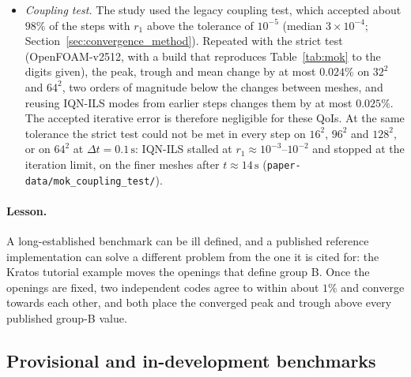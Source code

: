 \begin{itemize}
	\item \emph{Coupling test.} The study used the legacy coupling test, which accepted about $98\%$ of the steps with $r_1$ above the tolerance of $10^{-5}$ (median $3\times10^{-4}$; Section~\ref{sec:convergence_method}). Repeated with the strict test (OpenFOAM-v2512, with a build that reproduces Table~\ref{tab:mok} to the digits given), the peak, trough and mean change by at most $0.024\%$ on $32^2$ and $64^2$, two orders of magnitude below the changes between meshes, and reusing IQN-ILS modes from earlier steps changes them by at most $0.025\%$. The accepted iterative error is therefore negligible for these QoIs. At the same tolerance the strict test could not be met in every step on $16^2$, $96^2$ and $128^2$, or on $64^2$ at $\Delta t = 0.1\,\mathrm{s}$: IQN-ILS stalled at $r_1 \approx 10^{-3}$--$10^{-2}$ and stopped at the iteration limit, on the finer meshes after $t \approx 14\,\mathrm{s}$ (\texttt{paper-data/mok\_coupling\_test/}).
\end{itemize}

\paragraph{Lesson.}
A long-established benchmark can be ill defined, and a published reference implementation can solve a different problem from the one it is cited for: the Kratos tutorial example moves the openings that define group B.
Once the openings are fixed, two independent codes agree to within about $1\%$ and converge towards each other, and both place the converged peak and trough above every published group-B value.


\subsection{Provisional and in-development benchmarks}\label{sec:provisional}

